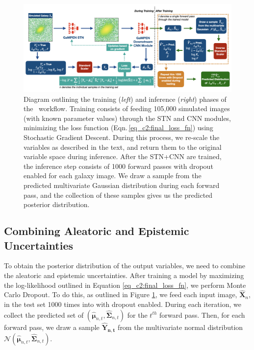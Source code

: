 \begin{figure}[htb]
    \centering
    \includegraphics[width
    =\textwidth]{workflow_gampen.png}
    \caption{Diagram outlining the training (\textit{left}) and inference (\textit{right}) phases of the \gampen\ workflow. Training consists of feeding 105,000 simulated images (with known parameter values) through the STN and CNN modules, minimizing the loss function (Eqn.\,\ref{eq_c2:final_loss_fn}) using Stochastic Gradient Descent. 
    During this process, we re-scale the variables as described in the text, and return them to the original variable space during inference.
    After the STN+CNN are trained, the inference step consists of 1000 forward passes with dropout enabled for each galaxy image. We draw a sample from the predicted multivariate Gaussian distribution during each forward pass, and the collection of these samples gives us the predicted posterior distribution.}
    \label{fig_c2:workflow}
\end{figure}

\subsection{Combining Aleatoric and Epistemic Uncertainties}
\label{subsec_c2:combining_uncertainties}
To obtain the posterior distribution of the output variables, we need to combine the aleatoric and epistemic uncertainties. After training a model by maximizing the log-likelihood outlined in Equation \ref{eq_c2:final_loss_fn}, we perform Monte Carlo Dropout. To do this, as outlined in Figure \ref{fig_c2:workflow}, we feed each input image, $\boldsymbol{\hat{X}}_n$, in the test set 1000 times into \gampen{} with dropout enabled. During each iteration, we collect the predicted set of $\left(\hat{\boldsymbol{\mu}}_{n,t},\boldsymbol{\hat{\Sigma}}_{n,t}\right)$ for the $t^{th}$ forward pass. Then, for each forward pass, we draw a sample $\boldsymbol{\hat{Y}_{n,t}}$ from the multivariate normal distribution $\mathcal{N}\left(\boldsymbol{\hat{\mu}}_{n,t},\boldsymbol{\hat{\Sigma}}_{n,t}\right)$. 

